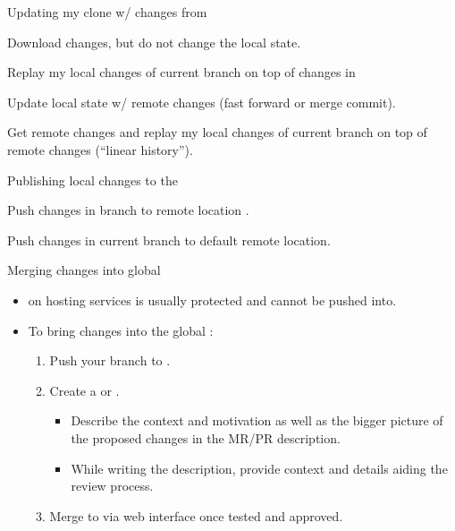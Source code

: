 \begin{frame}{Updating my clone w/ changes from }
\begin{block}{}
Download changes, but do not change the local state.
\end{block}
\begin{block}{}
Replay my local changes of current branch on top of changes in 
\end{block}
\begin{block}{}
Update local state w/ remote changes (fast forward or merge commit).
\end{block}
\begin{block}{}
Get remote changes and replay my local changes of current branch on top of remote changes (``linear history'').
\end{block}
\end{frame}

\begin{frame}{Publishing local changes to the }
\begin{block}{}
Push changes in branch  to remote location .
\end{block}
\begin{block}{}
Push changes in current branch to default remote location.
\end{block}
\end{frame}

\begin{frame}{Merging changes into global }
\begin{itemize}
\item {} on hosting services is usually protected and cannot be pushed into.
\item To bring changes into the global :
\begin{enumerate}
\item Push your branch to .
\item Create a  or .
\begin{itemize}
\item Describe the context and motivation as well as the bigger picture of the proposed changes in the MR/PR description.
\item While writing the description, provide context and details aiding the review process.
\end{itemize}
\item Merge to  via web interface once tested and approved.
\end{enumerate}
\end{itemize}
\end{frame}

